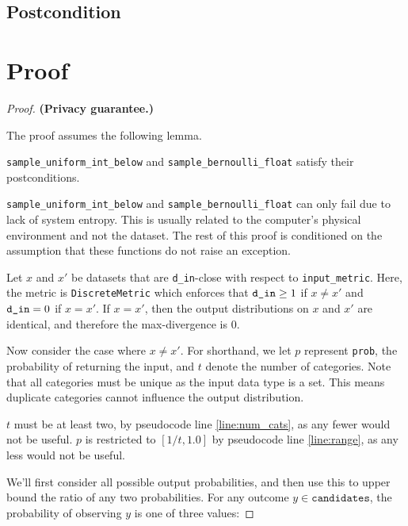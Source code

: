 \documentclass{article}
\begin{document}
\subsection*{Postcondition}


\section{Proof}

\begin{proof} 
\textbf{(Privacy guarantee.)} 
    
\begin{tcolorbox}
    The proof assumes the following lemma.
    \begin{lemma}
        \texttt{sample\_uniform\_int\_below} and \texttt{sample\_bernoulli\_float} satisfy their postconditions.
    \end{lemma}
\end{tcolorbox}

\texttt{sample\_uniform\_int\_below} and \texttt{sample\_bernoulli\_float} can only fail due to lack of system entropy. 
This is usually related to the computer's physical environment and not the dataset. 
The rest of this proof is conditioned on the assumption that these functions do not raise an exception. 

Let $x$ and $x'$ be datasets that are \texttt{d\_in}-close with respect to \texttt{input\_metric}.
Here, the metric is \texttt{DiscreteMetric} which enforces that $\texttt{d\_in} \geq 1$ if $x \ne x'$ and $\texttt{d\_in} = 0$ if $x = x'$. 
If $x = x'$, then the output distributions on $x$ and $x'$ are identical, and therefore the max-divergence is 0.

Now consider the case where $x \ne x'$. 
For shorthand, we let $p$ represent \texttt{prob}, the probability of returning the input,
and $t$ denote the number of categories.
Note that all categories must be unique as the input data type is a set.
This means duplicate categories cannot influence the output distribution.

$t$ must be at least two, by pseudocode line \ref{line:num_cats}, as any fewer would not be useful.
$p$ is restricted to $[1/t, 1.0]$ by pseudocode line \ref{line:range}, as any less would not be useful.

We'll first consider all possible output probabilities, 
and then use this to upper bound the ratio of any two probabilities.
For any outcome $y \in \texttt{candidates}$, 
the probability of observing $y$ is one of three values:


\end{proof}
\end{document}

